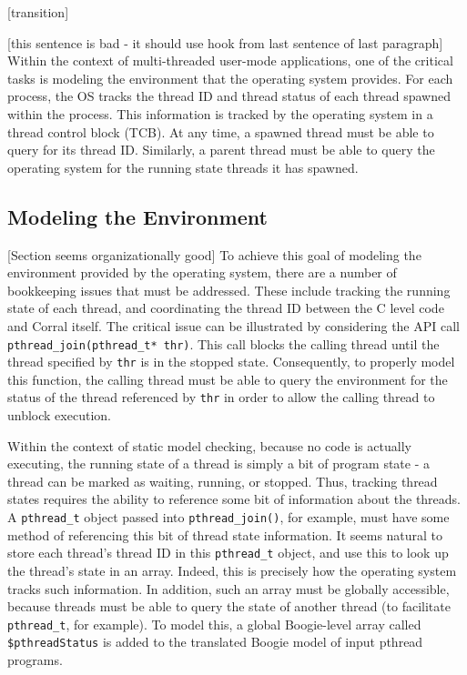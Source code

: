 [transition]

[this sentence is bad - it should use hook from last sentence of last
paragraph]  Within the context of multi-threaded user-mode
applications, one of the critical tasks is modeling the environment
that the operating system provides.  For each process, the OS tracks
the thread ID and thread status of each thread spawned within the
process.  This information is tracked by the operating system in a
thread control block (TCB).  At any time, a spawned thread must be
able to query for its thread ID.  Similarly, a parent thread must be
able to query the operating system for the running state threads it
has spawned. 

\subsection{Modeling the Environment}
[Section seems organizationally good]
To achieve this goal of modeling the environment provided by the
operating system, there are a number of bookkeeping issues that must
be addressed.  These include tracking the running state of each
thread, and coordinating the thread ID between the C level code and
Corral itself.  The critical issue can be illustrated by considering
the API call \lstinline|pthread_join(pthread_t* thr)|. This call
blocks the calling thread until the thread specified by
\lstinline|thr| is in the stopped state.  Consequently, to properly
model this function, the calling thread must be able to query the
environment for the status of the thread referenced by \lstinline|thr|
in order to allow the calling thread to unblock execution.  

Within the context of static model checking, because no code is
actually executing, the running state of a thread is simply a bit of
program state - a thread can be marked as waiting, running, or
stopped. Thus, tracking thread states requires the ability to
reference some bit of information about the threads. A
\lstinline|pthread_t| object passed into \lstinline|pthread_join()|,
for example, must have some method of referencing this bit of thread
state information.  It seems natural to store each thread's thread ID
in this \lstinline|pthread_t| object, and use this to look up the
thread's state in an array.  Indeed, this is precisely how the
operating system tracks such information.  In addition, such an array
must be globally accessible, because threads must be able to query
the state of another thread (to facilitate \lstinline|pthread_t|, for
example).  To model this, a global Boogie-level array called
\lstinline|$pthreadStatus| is added to the translated Boogie model of
input pthread programs.

